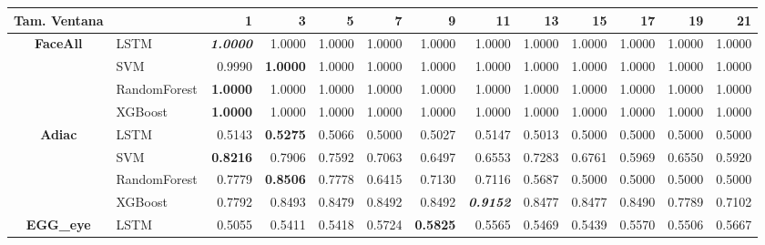 \begin{table}[H]
	\centering
	\begin{adjustbox}{max width=12cm}
		\begin{tabular}{|c|l|r|r|r|r|r|r|r|r|r|r|r|}
			\hline
			\textbf{Tam. Ventana} &              & 1               & 3      & 5      & 7               & 9               & 11              & 13     & 15     & 17              & 19     & 21              \\
			\hline
			\textbf{FaceAll}      & LSTM         & \textit{\textbf{1.0000}} & 1.0000 & 1.0000 & 1.0000          & 1.0000          & 1.0000          & 1.0000 & 1.0000 & 1.0000          & 1.0000 & 1.0000          \\
			                      & SVM          & 0.9990          & \textbf{1.0000} & 1.0000 & 1.0000          & 1.0000          & 1.0000          & 1.0000 & 1.0000 & 1.0000          & 1.0000 & 1.0000          \\
			                      & RandomForest & \textbf{1.0000}          & 1.0000 & 1.0000 & 1.0000          & 1.0000          & 1.0000          & 1.0000 & 1.0000 & 1.0000          & 1.0000 & 1.0000          \\
			                      & XGBoost      & \textbf{1.0000}          & 1.0000 & 1.0000 & 1.0000          & 1.0000          & 1.0000          & 1.0000 & 1.0000 & 1.0000          & 1.0000 & 1.0000          \\
			\hline
			\textbf{Adiac}        & LSTM         & 0.5143          & \textbf{0.5275} & 0.5066 & 0.5000          & 0.5027          & 0.5147          & 0.5013 & 0.5000 & 0.5000          & 0.5000 & 0.5000          \\
			                      & SVM          & \textbf{0.8216}          & 0.7906 & 0.7592 & 0.7063          & 0.6497          & 0.6553          & 0.7283 & 0.6761 & 0.5969          & 0.6550 & 0.5920          \\
			                      & RandomForest & 0.7779          & \textbf{0.8506} & 0.7778 & 0.6415          & 0.7130          & 0.7116          & 0.5687 & 0.5000 & 0.5000          & 0.5000 & 0.5000          \\
			                      & XGBoost      & 0.7792          & 0.8493 & 0.8479 & 0.8492          & 0.8492          & \textit{\textbf{0.9152}} & 0.8477 & 0.8477 & 0.8490          & 0.7789 & 0.7102          \\
			\hline
			\textbf{EGG\_eye}     & LSTM         & 0.5055          & 0.5411 & 0.5418 & 0.5724          & \textbf{0.5825}          & 0.5565          & 0.5469 & 0.5439 & 0.5570          & 0.5506 & 0.5667          \\

\end{tabular}
\end{adjustbox}
\end{table}
